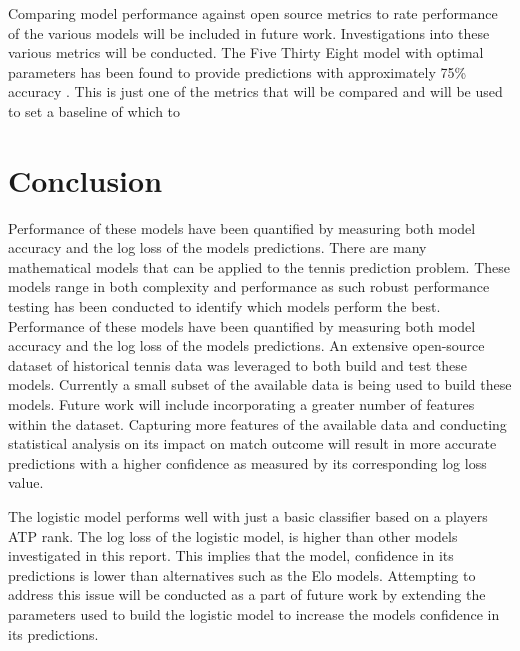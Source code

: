 \documentclass[12pt,a4paper]{article}
\begin{document}
Comparing model performance against open source metrics to rate performance of the various
models will be included in future work. Investigations into these various metrics will be
conducted. The Five Thirty Eight model with optimal parameters has been found to provide
predictions with approximately 75\% accuracy \cite{kovalchik_searching_2016}. This is just
one of the metrics that will be compared and will be used to set a baseline of which to


\clearpage

\section{Conclusion}
Performance of these models have been quantified by measuring both
model accuracy and the log loss of the models predictions. There are many mathematical models that can be applied to the tennis prediction problem.
These models range in both complexity and performance as such robust performance testing
has been conducted to identify which models perform the best. Performance of these models
have been quantified by measuring both model accuracy and the log loss of the models
predictions. An extensive open-source dataset of historical tennis data was leveraged to
both build and test these models. Currently a small subset of the available data is being
used to build these models. Future work will include incorporating a greater number of
features within the dataset. Capturing more features of the available data and conducting
statistical analysis on its impact on match outcome will result in more accurate predictions
with a higher confidence as measured by its corresponding log loss value.

The logistic model performs well with just a basic classifier based on a
players ATP rank. The log loss of the logistic model, is higher than other models
investigated in this report. This implies that the model,
confidence in its predictions is lower than alternatives such as the Elo models.
Attempting to address this issue will be conducted as a part of future work by
extending the parameters used to build the logistic model to increase the models
confidence in its predictions.
\end{document}
